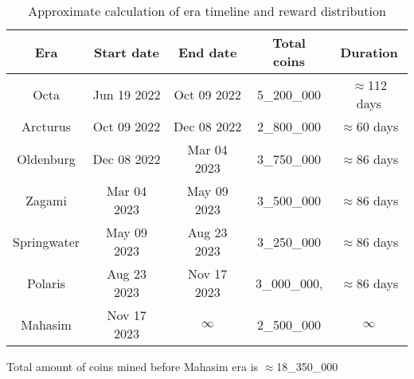 \begin{table}[h!]
\centering
\begin{tabular}{||c c c c c||}
    \hline
        Era & Start date & End date & Total coins & Duration \\ [0.5ex]

        \hline\hline
        Octa & Jun 19 2022 & Oct 09 2022 & 5\_200\_000 & $\approx$112 days \\
        Arcturus & Oct 09 2022 & Dec 08 2022 & 2\_800\_000 & $\approx$60 days \\
        Oldenburg & Dec 08 2022 & Mar 04 2023 & 3\_750\_000 & $\approx$86 days \\
        Zagami & Mar 04 2023 & May 09 2023 &  3\_500\_000 & $\approx$86 days \\
        Springwater & May 09 2023 & Aug 23 2023 & 3\_250\_000 & $\approx$86 days \\
        Polaris & Aug 23 2023& Nov 17 2023 & 3\_000\_000, & $\approx$86 days \\
        Mahasim & Nov 17 2023 & $\infty$ & 2\_500\_000 & $\infty$ \\ [1ex]
    \hline

\end{tabular}
\caption{Approximate calculation of era timeline and reward distribution}
\label{table:1}
\end{table}

Total amount of coins mined before Mahasim era is $\approx$18\_350\_000
